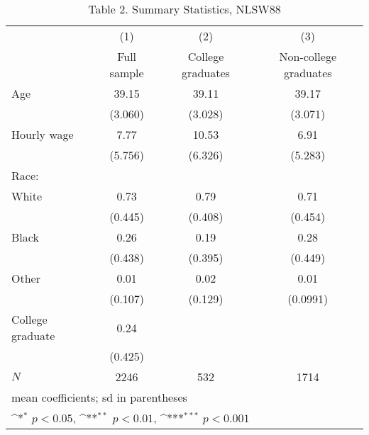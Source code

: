 \begin{table}[htbp]\centering
\def\sym#1{\ifmmode^{#1}\else\(^{#1}\)\fi}
\caption{Table 2. Summary Statistics, NLSW88}
\begin{tabular}{l*{3}{c}}
\hline\hline
          &\multicolumn{1}{c}{(1)}&\multicolumn{1}{c}{(2)}&\multicolumn{1}{c}{(3)}\\
          &\multicolumn{1}{c}{Full sample}&\multicolumn{1}{c}{College graduates}&\multicolumn{1}{c}{Non-college graduates}\\
\hline
Age       &    39.15         &    39.11         &    39.17         \\
          &  (3.060)         &  (3.028)         &  (3.071)         \\
Hourly wage&     7.77         &    10.53         &     6.91         \\
          &  (5.756)         &  (6.326)         &  (5.283)         \\
Race:     &                  &                  &                  \\
White     &     0.73         &     0.79         &     0.71         \\
          &  (0.445)         &  (0.408)         &  (0.454)         \\
Black     &     0.26         &     0.19         &     0.28         \\
          &  (0.438)         &  (0.395)         &  (0.449)         \\
Other     &     0.01         &     0.02         &     0.01         \\
          &  (0.107)         &  (0.129)         & (0.0991)         \\
College graduate&     0.24         &                  &                  \\
          &  (0.425)         &                  &                  \\
\hline
\(N\)     &     2246         &      532         &     1714         \\
\hline\hline
\multicolumn{4}{l}{\footnotesize mean coefficients; sd in parentheses}\\
\multicolumn{4}{l}{\footnotesize \sym{*} \(p<0.05\), \sym{**} \(p<0.01\), \sym{***} \(p<0.001\)}\\
\end{tabular}
\end{table}
